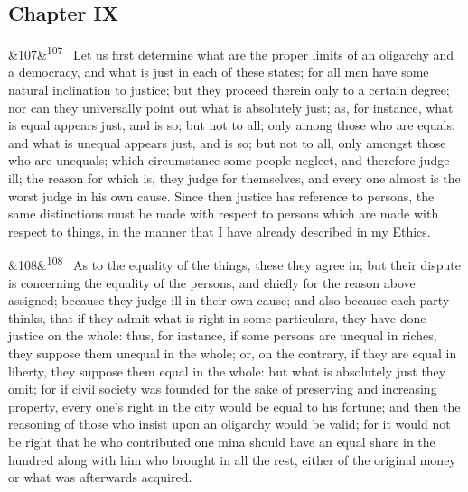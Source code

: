 \documentclass[12pt]{article}
\newcommand{\para}[1][]{\par\noindent\ifx&#1&\else\textsuperscript{\footnotesize #1}~\fi}
\begin{document}
\subsection*{Chapter IX}

\para[107] Let us first determine what are the proper limits of an oligarchy and a democracy, and what is just in each of these states; for all men have some natural inclination to justice; but they proceed therein only to a certain degree; nor can they universally point out what is absolutely just; as, for instance, what is equal appears just, and is so; but not to all; only among those who are equals: and what is unequal appears just, and is so; but not to all, only amongst those who are unequals; which circumstance some people neglect, and therefore judge ill; the reason for which is, they judge for themselves, and every one almost is the worst judge in his own cause. Since then justice has reference to persons, the same distinctions must be made with respect to persons which are made with respect to things, in the manner that I have already described in my Ethics.

\para[108] As to the equality of the things, these they agree in; but their dispute is concerning the equality of the persons, and chiefly for the reason above assigned; because they judge ill in their own cause; and also because each party thinks, that if they admit what is right in some particulars, they have done justice on the whole: thus, for instance, if some persons are unequal in riches, they suppose them unequal in the whole; or, on the contrary, if they are equal in liberty, they suppose them equal in the whole: but what is absolutely just they omit; for if civil society was founded for the sake of preserving and increasing property, every one's right in the city would be equal to his fortune; and then the reasoning of those who insist upon an oligarchy would be valid; for it would not be right that he who contributed one mina should have an equal share in the hundred along with him who brought in all the rest, either of the original money or what was afterwards acquired.
\end{document}
